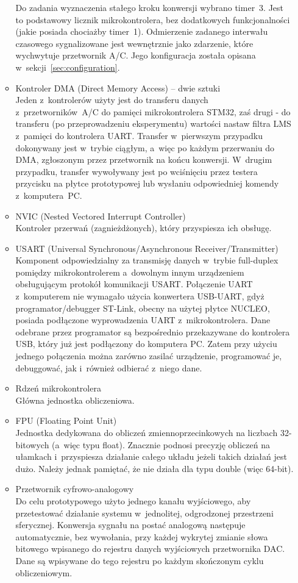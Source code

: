 \begin{enumerate}
\begin{itemize}
		Do zadania wyznaczenia stałego kroku konwersji wybrano timer~3. Jest to podstawowy licznik mikrokontrolera, bez dodatkowych funkcjonalności (jakie posiada chociażby timer~1). Odmierzenie zadanego interwału czasowego sygnalizowane jest wewnętrznie jako zdarzenie, które wychwytuje przetwornik A/C. Jego konfiguracja została opisana w~sekcji~\ref{sec:configuration}.
		\item Kontroler DMA (Direct Memory Access) -- dwie sztuki\\
		Jeden z~kontrolerów użyty jest do transferu danych z~przetworników~A/C do pamięci mikrokontrolera STM32, zaś drugi - do transferu (po przeprowadzeniu eksperymentu) wartości nastaw filtra LMS z~pamięci do kontrolera UART. Transfer w~pierwszym przypadku dokonywany jest w~trybie ciągłym, a~więc po każdym przerwaniu do DMA, zgłoszonym przez przetwornik na końcu konwersji. W~drugim przypadku, transfer wywoływany jest po wciśnięciu przez testera przycisku na płytce prototypowej lub wysłaniu odpowiedniej komendy z~komputera~PC.
		\item NVIC (Nested Vectored Interrupt Controller)\\
		Kontroler przerwań (zagnieżdżonych), który przyspiesza ich obsługę.
		\item USART (Universal Synchronous/Asynchronous Receiver/Transmitter)\\
		Komponent odpowiedzialny za transmisję danych w~trybie full-duplex pomiędzy mikrokontrolerem a~dowolnym innym urządzeniem obsługującym protokół komunikacji USART. Połączenie UART z~komputerem nie wymagało użycia konwertera USB-UART, gdyż programator/debugger ST-Link, obecny na użytej płytce NUCLEO, posiada podłączone wyprowadzenia UART z~mikrokontrolera. Dane odebrane przez programator są bezpośrednio przekazywane do kontrolera USB, który już jest podłączony do komputera PC. Zatem przy użyciu jednego połączenia można zarówno zasilać urządzenie, programować je, debuggować, jak i~również odbierać z~niego dane.
		\item Rdzeń mikrokontrolera\\
		Główna jednostka obliczeniowa.
		\item FPU (Floating Point Unit)\\
		Jednostka dedykowana do obliczeń zmiennoprzecinkowych na liczbach 32-bitowych (a~więc typu float). Znacznie podnosi precyzję obliczeń na ułamkach i~przyspiesza działanie całego układu jeżeli takich działań jest dużo. Należy jednak pamiętać, że nie działa dla typu double (więc 64-bit). 
		\item Przetwornik cyfrowo-analogowy\\
		Do celu prototypowego użyto jednego kanału wyjściowego, aby przetestować działanie systemu w~jednolitej, odgrodzonej przestrzeni sferycznej. Konwersja sygnału na postać analogową następuje automatycznie, bez wywołania, przy każdej wykrytej zmianie słowa bitowego wpisanego do rejestru danych wyjściowych przetwornika DAC. Dane są wpisywane do tego rejestru po każdym skończonym cyklu obliczeniowym.
	\end{itemize}
\end{enumerate}

